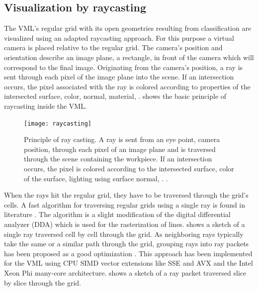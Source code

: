 \subsection{Visualization by raycasting}
\label{sec:raycasting}

The VML's regular grid with its open geometries resulting from classification are visualized using an adapted raycasting approach.
For this purpose a virtual camera is placed relative to the regular grid.
The camera's position and orientation describe an image plane, \ie a rectangle, in front of the camera which will correspond to the final image.
Originating from the camera's position, a ray is sent through each pixel of the image plane into the scene.
If an intersection occurs, the pixel associated with the ray is colored according to properties of the intersected surface, \eg color, normal, material, \etc.
 shows the basic principle of raycasting inside the VML.

\begin{figure}
	\centering
	\texttt{[image: raycasting]}
	\caption{
		Principle of ray casting.
		A ray is sent from an eye point, \ie camera position, through each pixel of an image plane and is traversed through the scene containing the workpiece.
		If an intersection occurs, the pixel is colored according to the intersected surface, \protect\eg color of the surface, lighting using surface normal, \protect\etc.
		\cite{enlight_demo_workshop}.
	}
	\label{fig:raycasting_principle}
\end{figure}

When the rays hit the regular grid, they have to be traversed through the grid's cells.
A fast algorithm for traversing regular grids using a single ray is found in literature \cite{3DDDA}.
The algorithm is a slight modification of the digital differential analyzer (DDA) which is used for the rasterization of lines.
 shows a sketch of a single ray traversed cell by cell through the grid.
%
As neighboring rays typically take the same or a similar path through the grid, grouping rays into ray packets has been proposed as a good optimization \cite{packet_caster}.
This approach has been implemented for the VML using CPU SIMD vector extensions like SSE and AVX  \cite{enlight} and the Intel Xeon Phi many-core architecture.
 shows a sketch of a ray packet traversed slice by slice through the grid.


